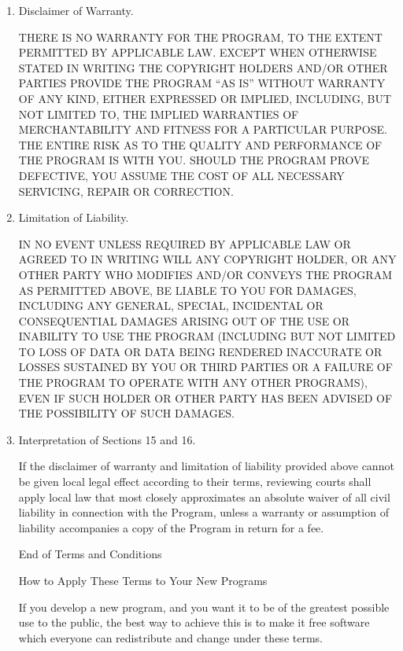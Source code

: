 \documentclass{article}%
\begin{document}
\begin{enumerate}
\item Disclaimer of Warranty.

\begin{sloppypar}
 THERE IS NO WARRANTY FOR THE PROGRAM, TO THE EXTENT PERMITTED BY
 APPLICABLE LAW.        EXCEPT WHEN OTHERWISE STATED IN WRITING THE
 COPYRIGHT HOLDERS AND/OR OTHER PARTIES PROVIDE THE PROGRAM ``AS IS''
 WITHOUT WARRANTY OF ANY KIND, EITHER EXPRESSED OR IMPLIED,
 INCLUDING, BUT NOT LIMITED TO, THE IMPLIED WARRANTIES OF
 MERCHANTABILITY AND FITNESS FOR A PARTICULAR PURPOSE.  THE ENTIRE
 RISK AS TO THE QUALITY AND PERFORMANCE OF THE PROGRAM IS WITH YOU.
 SHOULD THE PROGRAM PROVE DEFECTIVE, YOU ASSUME THE COST OF ALL
 NECESSARY SERVICING, REPAIR OR CORRECTION.
\end{sloppypar}

\item Limitation of Liability.

 IN NO EVENT UNLESS REQUIRED BY APPLICABLE LAW OR AGREED TO IN
 WRITING WILL ANY COPYRIGHT HOLDER, OR ANY OTHER PARTY WHO MODIFIES
 AND/OR CONVEYS THE PROGRAM AS PERMITTED ABOVE, BE LIABLE TO YOU FOR
 DAMAGES, INCLUDING ANY GENERAL, SPECIAL, INCIDENTAL OR CONSEQUENTIAL
 DAMAGES ARISING OUT OF THE USE OR INABILITY TO USE THE PROGRAM
 (INCLUDING BUT NOT LIMITED TO LOSS OF DATA OR DATA BEING RENDERED
 INACCURATE OR LOSSES SUSTAINED BY YOU OR THIRD PARTIES OR A FAILURE
 OF THE PROGRAM TO OPERATE WITH ANY OTHER PROGRAMS), EVEN IF SUCH
 HOLDER OR OTHER PARTY HAS BEEN ADVISED OF THE POSSIBILITY OF SUCH
 DAMAGES.

\item Interpretation of Sections 15 and 16.

If the disclaimer of warranty and limitation of liability provided
above cannot be given local legal effect according to their terms,
reviewing courts shall apply local law that most closely approximates
an absolute waiver of all civil liability in connection with the
Program, unless a warranty or assumption of liability accompanies a
copy of the Program in return for a fee.

\begin{center}
{\Large\sc End of Terms and Conditions}

\bigskip
How to Apply These Terms to Your New Programs
\end{center}

If you develop a new program, and you want it to be of the greatest
possible use to the public, the best way to achieve this is to make it
free software which everyone can redistribute and change under these terms.


\end{enumerate}
\end{document}

